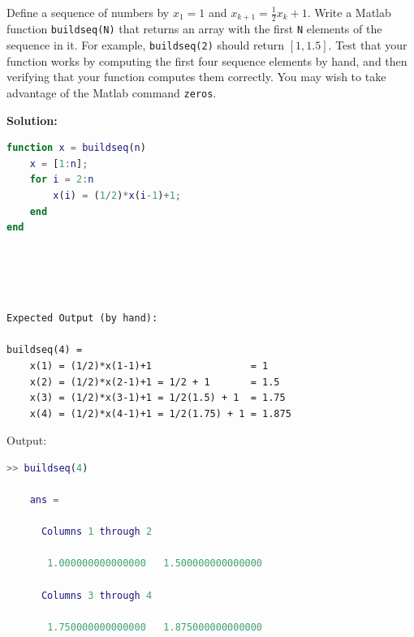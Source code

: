 \documentclass[12pt]{article}
\makeatletter
\theoremstyle{homework}
\newenvironment{exercise}[1]
{\def\@currentlabel{#1}\exercisecore}
{\endexercisecore}
\newcommand{\localhead}[1]{\par\smallskip\noindent\textbf{#1}\nobreak\\}%
\newcommand\solution{\localhead{Solution:}}
\makeatother
\begin{document}
\begin{exercise}{DM 3} Define a sequence of numbers by $x_1=1$ and $x_{k+1}=\frac{1}{2}x_{k} + 1$.  Write a Matlab function \texttt{buildseq(N)} that returns an array
with the first \texttt{N} elements of the sequence in it.  For example,
\texttt{buildseq(2)} should return $[1,1.5]$.  Test that your function
works by computing the first four sequence elements by hand, and then
verifying that your function computes them correctly.  You may wish 
to take advantage of the Matlab command \texttt{zeros}.
\end{exercise}
\solution

\begin{lstlisting}[language=Matlab]
function x = buildseq(n)
    x = [1:n];
    for i = 2:n
        x(i) = (1/2)*x(i-1)+1;
    end
end
\end{lstlisting}
\begin{verbatim}




Expected Output (by hand):

buildseq(4) =
	x(1) = (1/2)*x(1-1)+1                 = 1
	x(2) = (1/2)*x(2-1)+1 = 1/2 + 1       = 1.5
	x(3) = (1/2)*x(3-1)+1 = 1/2(1.5) + 1  = 1.75
	x(4) = (1/2)*x(4-1)+1 = 1/2(1.75) + 1 = 1.875

\end{verbatim}
Output:
\begin{lstlisting}[language=Matlab]
	>> buildseq(4)

	ans =
	
	  Columns 1 through 2
	
	   1.000000000000000   1.500000000000000
	
	  Columns 3 through 4
	
	   1.750000000000000   1.875000000000000
\end{lstlisting}
\end{document}
